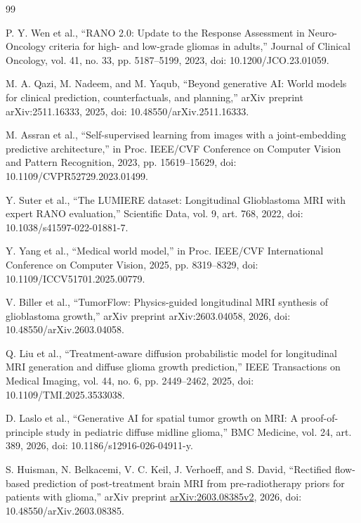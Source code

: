 \clearpage{}\begin{singlespace}\begin{thebibliography}{99}

 P. Y. Wen et al., “RANO 2.0: Update to the Response Assessment in Neuro-Oncology criteria for high- and low-grade gliomas in adults,” Journal of Clinical Oncology, vol. 41, no. 33, pp. 5187–5199, 2023, doi: 10.1200/JCO.23.01059.

 M. A. Qazi, M. Nadeem, and M. Yaqub, “Beyond generative AI: World models for clinical prediction, counterfactuals, and planning,” arXiv preprint arXiv:2511.16333, 2025, doi: 10.48550/arXiv.2511.16333.

 M. Assran et al., “Self-supervised learning from images with a joint-embedding predictive architecture,” in Proc. IEEE/CVF Conference on Computer Vision and Pattern Recognition, 2023, pp. 15619–15629, doi: 10.1109/CVPR52729.2023.01499.

 Y. Suter et al., “The LUMIERE dataset: Longitudinal Glioblastoma MRI with expert RANO evaluation,” Scientific Data, vol. 9, art. 768, 2022, doi: 10.1038/s41597-022-01881-7.

 Y. Yang et al., “Medical world model,” in Proc. IEEE/CVF International Conference on Computer Vision, 2025, pp. 8319–8329, doi: 10.1109/ICCV51701.2025.00779.

 V. Biller et al., “TumorFlow: Physics-guided longitudinal MRI synthesis of glioblastoma growth,” arXiv preprint arXiv:2603.04058, 2026, doi: 10.48550/arXiv.2603.04058.

 Q. Liu et al., “Treatment-aware diffusion probabilistic model for longitudinal MRI generation and diffuse glioma growth prediction,” IEEE Transactions on Medical Imaging, vol. 44, no. 6, pp. 2449–2462, 2025, doi: 10.1109/TMI.2025.3533038.

 D. Laslo et al., “Generative AI for spatial tumor growth on MRI: A proof-of-principle study in pediatric diffuse midline glioma,” BMC Medicine, vol. 24, art. 389, 2026, doi: 10.1186/s12916-026-04911-y.

 S. Huisman, N. Belkacemi, V. C. Keil, J. Verhoeff, and S. David, “Rectified flow-based prediction of post-treatment brain MRI from pre-radiotherapy priors for patients with glioma,” arXiv preprint \href{https://arxiv.org/abs/2603.08385v2}{arXiv:2603.08385v2}, 2026, doi: 10.48550/arXiv.2603.08385.


\end{thebibliography}
\end{singlespace}

